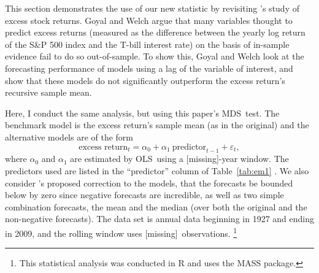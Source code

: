 \documentclass[12pt,fleqn]{article}
\newcommand\citepos[2][]{\citeauthor{#2}'s \citeyearpar[#1]{#2}}
\providecommand\windowlength{[missing]}
\providecommand\empiricaltable{[missing]}
\theoremstyle{definition}
\newcommand{\ep}{\varepsilon}
\newcommand{\mds}{MDS}
\newcommand{\ols}{OLS}
\newcommand{\oos}{OOS}
\begin{document}
This section demonstrates the use of our new statistic by revisiting
\citepos{GoW:08} study of excess stock returns.  Goyal and Welch argue
that many variables thought to predict excess returns (measured as the
difference between the yearly log return of the S\&P 500 index and the
T-bill interest rate) on the basis of in-sample evidence fail to do so
out-of-sample.  To show this, Goyal and Welch look at the forecasting
performance of models using a lag of the variable of interest, and
show that these models do not significantly outperform the excess
return's recursive sample mean.

Here, I conduct the same analysis, but using this paper's \mds\ test.
The benchmark model is the excess return's sample mean (as in the
original) and the alternative models are of the form
\[\text{excess return}_{t} = \alpha_{0} + \alpha_{1}\ 
\text{predictor}_{t-1} + \ep_{t},\] where $\alpha_{0}$ and
$\alpha_{1}$ are estimated by \ols\ using a \windowlength-year window.
The predictors used are listed in the ``predictor'' column of
Table~\ref{tab:em1} \citep[see][for a detailed description of the
variables]{GoW:08}.  We also consider \citepos{CaT:08} proposed
correction to the models, that the forecasts be bounded below by zero
since negative forecasts are incredible, as well as two simple
combination forecasts, the mean and the median (over both the original
and the non-negative forecasts).  The data set is annual data
beginning in 1927 and ending in 2009, and the rolling window uses
\windowlength\ observations.%
\footnote{This statistical analysis was conducted in R \citep{R} and
  uses the MASS \citep[7.3-22]{VeR:02} package.} %

\begin{table}[tb!]
  \centering
  \empiricaltable
\caption{Results from \oos\ comparison of equity premium prediction
  models; the benchmark is the recursive sample mean of the equity
  premium and each alternative model is a constant and single lag of
  the variable listed in the ``predictor'' column.  The dataset begins
  in 1927 and ends in 2009 and is annual data. The ``value'' column
  lists the value of this paper's \oos\ statistic, the ``naive''
  column indicates whether the statistic is significant at standard
  critical values, and the ``corrected'' column indicates significance
  using the critical values proposed in Theorem~\ref{res:2} that
  account for the number of models.  See Section~\ref{sec:3} for details.}
\label{tab:em1}
\end{table}
\end{document}

